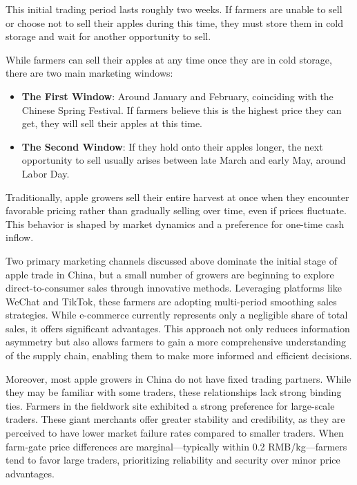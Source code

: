 This initial trading period lasts roughly two weeks. If farmers are unable to sell or choose not to sell their apples during this time, they must store them in cold storage and wait for another opportunity to sell.

While farmers can sell their apples at any time once they are in cold storage, there are two main marketing windows:

\begin{itemize}
    \item \textbf{The First Window}: Around January and February, coinciding with the Chinese Spring Festival. If farmers believe this is the highest price they can get, they will sell their apples at this time.
    \item \textbf{The Second Window}: If they hold onto their apples longer, the next opportunity to sell usually arises between late March and early May, around Labor Day.
\end{itemize}

Traditionally, apple growers sell their entire harvest at once when they encounter favorable pricing rather than gradually selling over time, even if prices fluctuate. This behavior is shaped by market dynamics and a preference for one-time cash inflow.

Two primary marketing channels discussed above dominate the initial stage of apple trade in China, but a small number of growers are beginning to explore direct-to-consumer sales through innovative methods. Leveraging platforms like WeChat and TikTok, these farmers are adopting multi-period smoothing sales strategies. While e-commerce currently represents only a negligible share of total sales, it offers significant advantages. This approach not only reduces information asymmetry but also allows farmers to gain a more comprehensive understanding of the supply chain, enabling them to make more informed and efficient decisions.


Moreover, most apple growers in China do not have fixed trading partners. While they may be familiar with some traders, these relationships lack strong binding ties. Farmers in the fieldwork site exhibited a strong preference for large-scale traders. These giant merchants offer greater stability and credibility, as they are perceived to have lower market failure rates compared to smaller traders. When farm-gate price differences are marginal—typically within 0.2 RMB/kg—farmers tend to favor large traders, prioritizing reliability and security over minor price advantages.




